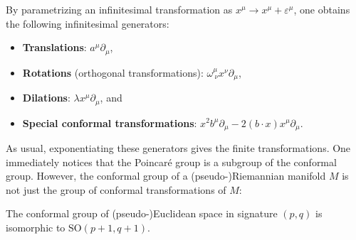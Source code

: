     By parametrizing an infinitesimal transformation as $x^\mu\rightarrow x^\mu+\varepsilon^\mu$, one obtains the following infinitesimal generators:
    \begin{itemize}
        \item\textbf{Translations}: $a^\mu\partial_\mu$,
        \item\textbf{Rotations} (orthogonal transformations): $\omega^\mu_{\ \nu}x^\nu\partial_\mu$,
        \item\textbf{Dilations}: $\lambda x^\mu\partial_\mu$, and
        \item\textbf{Special conformal transformations}: $x^2b^\mu\partial_\mu - 2(b\cdot x)x^\mu\partial_\mu$.
    \end{itemize}
    As usual, exponentiating these generators gives the finite transformations. One immediately notices that the Poincar\'e group is a subgroup of the conformal group. However, the conformal group of a (pseudo-)Riemannian manifold $M$ is not just the group of conformal transformations of $M$:
    \begin{property}
        The conformal group of (pseudo-)Euclidean space in signature $(p,q)$ is isomorphic to $\mathrm{SO}(p+1,q+1)$.
    \end{property}